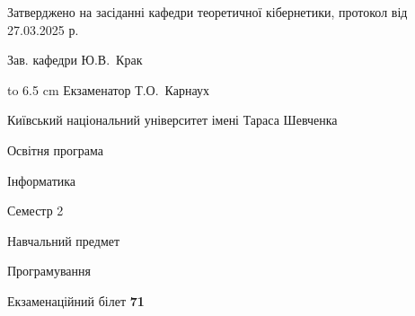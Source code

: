 \documentclass[12pt, ukrainian]{article}
\begin{document}
{\smallskip\smallskip \begin {scriptsize} Затверджено на засіданні кафедри теоретичної кібернетики, протокол   від   27.03.2025 р.\par\smallskip\smallskip\smallskip\smallskip
{\parbox {6.5 cm} {Зав. кафедри \dotfill Ю.В.~Крак}}\hspace {0.7cm} {\hbox to 6.5 cm { Екзаменатор \dotfill Т.О.~Карнаух}} \end{scriptsize}}
\newpage
{{\begin {scriptsize}\par
{ \center  Київський національний університет імені Тараса Шевченка \par}
{\parbox {5 cm}{Освітня програма \hfill}{\parbox {7 cm}{Інформатика\hfill}}\parbox {6 cm}{\hfill Семестр 2}}\par
{\parbox {5 cm} {Навчальний предмет \hfill}\parbox {7 cm}{Програмування \hfill}\parbox {6cm}{\hfill}\par}\vspace{-15pt} \end{scriptsize}}{\center Екзаменаційний білет \No \textbf { 71 }\par}}
\end{document}
